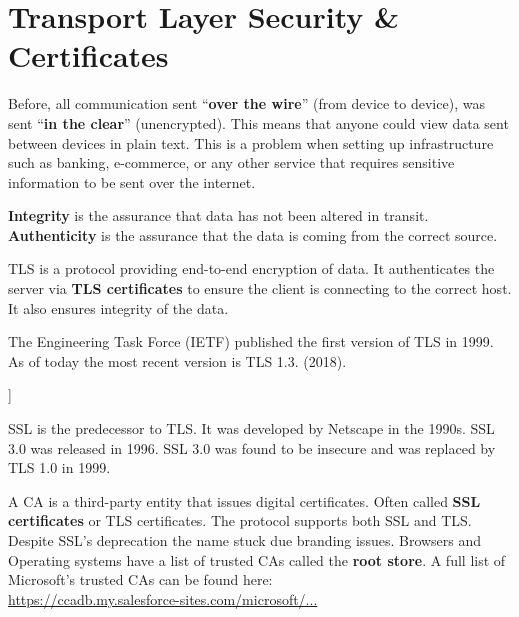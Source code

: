 \section{Transport Layer Security \& Certificates}
Before, all communication sent ``\textbf{over the wire}'' (from device to device),
was sent ``\textbf{in the clear}'' (unencrypted). This means that anyone could 
view data sent between devices in plain text. This is a problem when setting up 
infrastructure such as banking, e-commerce, or any other service that requires
sensitive information to be sent over the internet.

\begin{Def}

    \textbf{Integrity} is the assurance that data has not been altered in transit.\\
    \textbf{Authenticity} is the assurance that the data is coming from the correct source.
\end{Def}
\begin{Def}

    TLS is a protocol providing end-to-end encryption of data. It authenticates
    the server via \textbf{TLS certificates} to ensure the client is connecting to 
    the correct host. It also ensures integrity of the data.

    The Engineering Task Force (IETF) published the first version of TLS in 1999. As of 
    today the most recent version is TLS 1.3. (2018).
    \hfill \cite{cloudflare_tls}
\end{Def}

\begin{Def}[Secure Sockets Layer (SSL) [Deprecated]]

    SSL is the predecessor to TLS. It was developed by Netscape in the 1990s. 
    SSL 3.0 was released in 1996. SSL 3.0 was found to be insecure and was replaced
    by TLS 1.0 in 1999.
    \hfill \cite{cloudflare_tls}
\end{Def}

\begin{Def}

    A CA is a third-party entity that issues digital certificates. Often called \textbf{SSL certificates} or TLS certificates.
    The protocol supports both SSL and TLS. Despite SSL's deprecation the name stuck due branding issues.
    Browsers and Operating systems have a list of trusted CAs called the \textbf{root store}.
    A full list of Microsoft's trusted CAs can be found here:\\ \href{https://ccadb.my.salesforce-sites.com/microsoft/IncludedCACertificateReportForMSFT}{https://ccadb.my.salesforce-sites.com/microsoft/...}
    \hfill \cite{kinsta_tls_ssl}
\end{Def}

